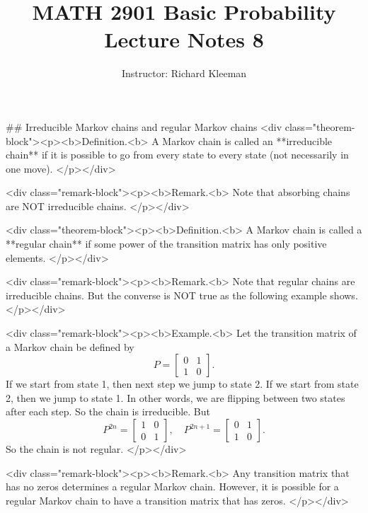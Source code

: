 


\title{MATH 2901 Basic Probability Lecture Notes 8}
\author{Instructor: Richard Kleeman}
\date{}
\maketitle


## Irreducible Markov chains and regular Markov chains
<div class="theorem-block"><p><b>Definition.<b> 
A Markov chain is called an **irreducible chain** if it is possible to go from every state to every state (not necessarily in one move).
</p></div>

<div class="remark-block"><p><b>Remark.<b> 
Note that absorbing chains are NOT irreducible chains.
</p></div>

<div class="theorem-block"><p><b>Definition.<b> 
A Markov chain is called a **regular chain** if some power of the transition matrix has only positive elements. 
</p></div>

<div class="remark-block"><p><b>Remark.<b> 
Note that regular chains are irreducible chains. But the converse is NOT true as the following example shows.
</p></div>

<div class="remark-block"><p><b>Example.<b> 
Let the transition matrix of a Markov chain be defined by
$$\begin{equation}
    P = \begin{bmatrix} 0 & 1 \\ 1 & 0 \end{bmatrix}.
\end{equation}$$
If we start from state 1, then next step we jump to state 2. If we start from state 2, then we jump to state 1. In other words, we are flipping between two states after each step. So the chain is irreducible. But 
$$\begin{equation}
    P^{2n} = \begin{bmatrix} 1 & 0 \\ 0 & 1 \end{bmatrix}, \quad 
    P^{2n+1} = \begin{bmatrix} 0 & 1 \\ 1 & 0 \end{bmatrix}.
\end{equation}$$
So the chain is not regular.
</p></div>

<div class="remark-block"><p><b>Remark.<b> 
Any transition matrix that has no zeros determines a regular Markov chain. However, it is possible for a regular Markov chain to have a transition matrix that has zeros.
</p></div>

